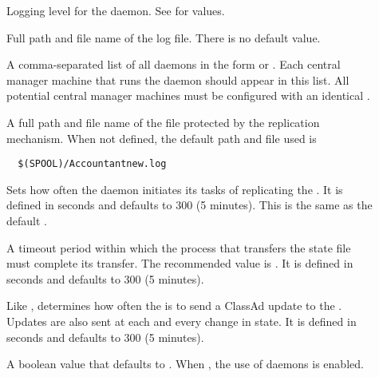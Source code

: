 \begin{description}
\item[]
  \label{param:HADDebug}
  Logging level for the  daemon.
  See  for values.

\item[]
  \label{param:HADLog}
  Full path and file name of the log file.
  There is no default value.

\item[]
  \label{param:ReplicationList}
  A comma-separated list of all  daemons
  in the form  or .
  Each central manager machine that runs the  daemon
  should appear in this list.
  All potential central manager machines must be configured with
  an identical .

\item[]
  \label{param:StateFile}
  A full path and file name of the file protected by the replication
  mechanism.
  When not defined, the default path and file used is
  \begin{verbatim}
  $(SPOOL)/Accountantnew.log
  \end{verbatim}

\item[]
  \label{param:ReplicationInterval}
  Sets how often the  daemon initiates its tasks of
  replicating the .
  It is defined in seconds and defaults to 300 (5 minutes).
  This is the same as the default .

\item[]
  \label{param:MaxTransferLifetime}
  A timeout period within which the process that
  transfers the state file must complete its transfer.
  The recommended value is
  .
  It is defined in seconds and defaults to 300 (5 minutes).

\item[]
  \label{param:HADUpdateInterval}
  Like ,
  determines how often the  is to send a ClassAd update
  to the .
  Updates are also sent at each and every change in state.
  It is defined in seconds and defaults to 300 (5 minutes).

\item[]
  \label{param:HADUseReplication}
  A boolean value that defaults to .
  When , the use of  daemons is enabled.


\end{description}

